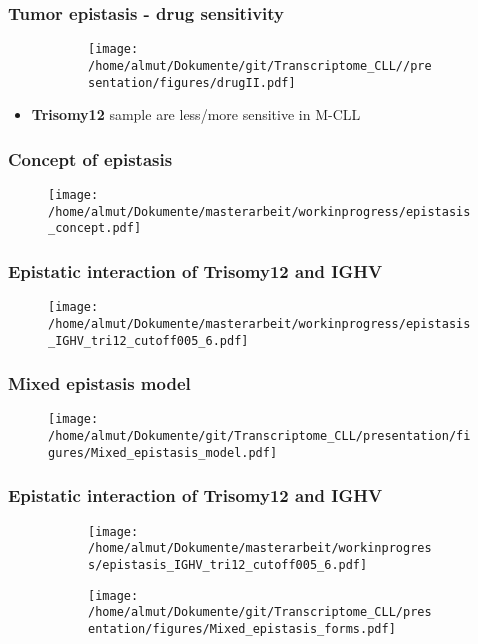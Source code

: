 \documentclass[xcolor=dvipsnames,t,10pt]{beamer}
\begin{document}
%
\begin{frame}[c]
	\frametitle{Tumor epistasis - drug sensitivity}
	\begin{figure}
		\centering
		\begin{subfigure}[t]{0.65\columnwidth}
			\texttt{[image: /home/almut/Dokumente/git/Transcriptome\_CLL//presentation/figures/drugII.pdf]}
		\end{subfigure}
		\hfill
	\end{figure}
	\begin{itemize}
		\item \textbf{Trisomy12} sample are less/more sensitive in M-CLL
	\end{itemize}
\end{frame}
%
%
\begin{frame}[c]
	\frametitle{Concept of epistasis}
	\begin{figure}
		\centering
		\texttt{[image: /home/almut/Dokumente/masterarbeit/workinprogress/epistasis\_concept.pdf]}
	\end{figure}
\end{frame}
%
\begin{frame}[c]
	\frametitle{Epistatic interaction of Trisomy12 and IGHV}
	\begin{figure}
		\centering
		\texttt{[image: /home/almut/Dokumente/masterarbeit/workinprogress/epistasis\_IGHV\_tri12\_cutoff005\_6.pdf]}
	\end{figure}
\end{frame}
%
%
\begin{frame}[c]
	\frametitle{Mixed epistasis model}
	\begin{figure}
		\centering
		\texttt{[image: /home/almut/Dokumente/git/Transcriptome\_CLL/presentation/figures/Mixed\_epistasis\_model.pdf]}
	\end{figure}
\end{frame}
%
%
%
\begin{frame}[c]
	\frametitle{Epistatic interaction of Trisomy12 and IGHV}
	\begin{figure}
		\centering
		\begin{subfigure}[t]{0.53\columnwidth}
		\texttt{[image: /home/almut/Dokumente/masterarbeit/workinprogress/epistasis\_IGHV\_tri12\_cutoff005\_6.pdf]}
		\end{subfigure}
		\hfill
		\begin{subfigure}[t]{0.3\textwidth}
			\texttt{[image: /home/almut/Dokumente/git/Transcriptome\_CLL/presentation/figures/Mixed\_epistasis\_forms.pdf]}
		\end{subfigure}
	\end{figure}
\end{frame}
\end{document}
